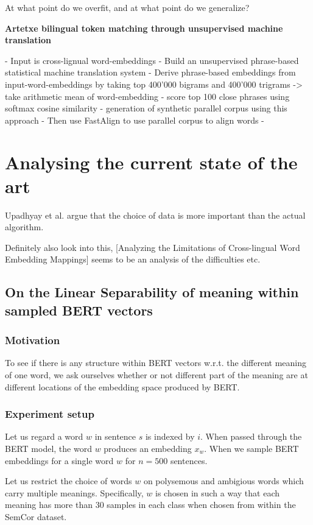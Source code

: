 \documentclass[a4paper,12pt,twoside,openright]{report}
\begin{document}
At what point do we overfit, and at what point do we generalize?


\textbf{Artetxe bilingual token matching through unsupervised machine translation}

- Input is cross-lignual word-embeddings
- Build an unsupervised phrase-based statistical machine translation system
- Derive phrase-based embeddings from input-word-embeddings by taking top 400'000 bigrams and 400'000 trigrams -> take arithmetic mean of word-embedding
- score top 100 close phrases using softmax cosine similarity
- generation of synthetic parallel corpus using this approach
- Then use FastAlign to use parallel corpus to align words
- 

\chapter{Analysing the current state of the art}

Upadhyay et al. argue that the choice of data is more important than the actual algorithm.

Definitely also look into this, [Analyzing the Limitations of Cross-lingual Word Embedding Mappings] seems to be an analysis of the difficulties etc. 

\section{On the Linear Separability of meaning within sampled BERT vectors}

\subsection{Motivation}

To see if there is any structure within BERT vectors w.r.t. the different meaning of one word, we ask ourselves whether or not different part of the meaning are at different locations of the embedding space produced by BERT.

\subsection{Experiment setup}

Let us regard a word $w$ in sentence $s$ is indexed by $i$.
When passed through the BERT model, the word $w$ produces an embedding $x_w$.
When we sample BERT embeddings for a single word $w$ for $n=500$ sentences. 

Let us restrict the choice of words $w$ on polysemous and ambigious words which carry multiple meanings. 
Specifically, $w$ is chosen in such a way that each meaning has more than 30 samples in each class when chosen from within the SemCor dataset. 
\end{document}
